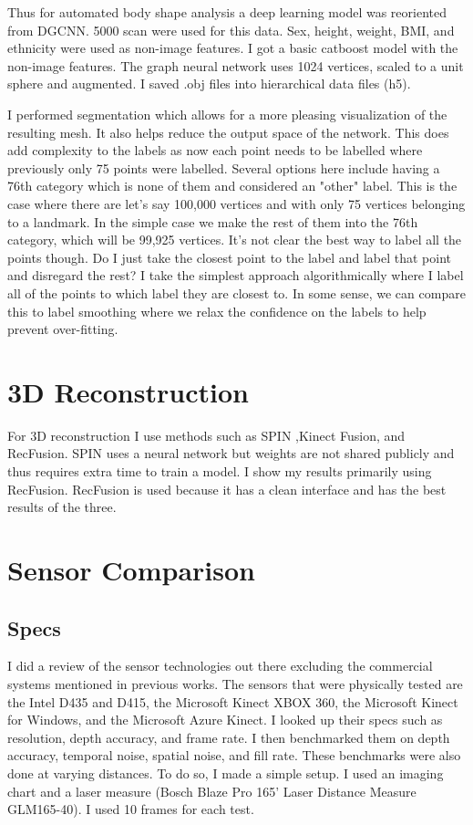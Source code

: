Thus for automated body shape analysis a deep learning model was reoriented from DGCNN. 5000 scan were used for this data. Sex, height, weight, BMI, and ethnicity were used as non-image features. I got a basic catboost model with the non-image features. The graph neural network uses 1024 vertices, scaled to a unit sphere and augmented. I saved .obj files into hierarchical data files (h5). 

I performed segmentation which allows for a more pleasing visualization of the resulting mesh. It also helps reduce the output space of the network. This does add complexity to the labels as now each point needs to be labelled where previously only 75 points were labelled. Several options here include having a 76th category which is none of them and considered an "other" label. This is the case where there are let's say 100,000 vertices and with only 75 vertices belonging to a landmark. In the simple case we make the rest of them into the 76th category, which will be 99,925 vertices. It's not clear the best way to label all the points though. Do I just take the closest point to the label and label that point and disregard the rest? I take the simplest approach algorithmically where I label all of the points to which label they are closest to. In some sense, we can compare this to label smoothing where we relax the confidence on the labels to help prevent over-fitting.

\section{3D Reconstruction}
For 3D reconstruction I use methods such as SPIN \cite{kolotouros2019learning} ,Kinect Fusion, and RecFusion. SPIN uses a neural network but weights are not shared publicly and thus requires extra time to train a model. I show my results primarily using RecFusion. RecFusion is used because it has a clean interface and has the best results of the three.
\section{Sensor Comparison}

\subsection{Specs}

I did a review of the sensor technologies out there excluding the commercial systems mentioned in previous works. The sensors that were physically tested are the Intel D435 and D415, the Microsoft Kinect XBOX 360, the Microsoft Kinect for Windows, and the Microsoft Azure Kinect. I looked up their specs such as resolution, depth accuracy, and frame rate. I then benchmarked them on depth accuracy, temporal noise, spatial noise, and fill rate. These benchmarks were also done at varying distances. To do so, I made a simple setup. I used an imaging chart and a laser measure (Bosch Blaze Pro 165' Laser Distance Measure GLM165-40). I used 10 frames for each test.

